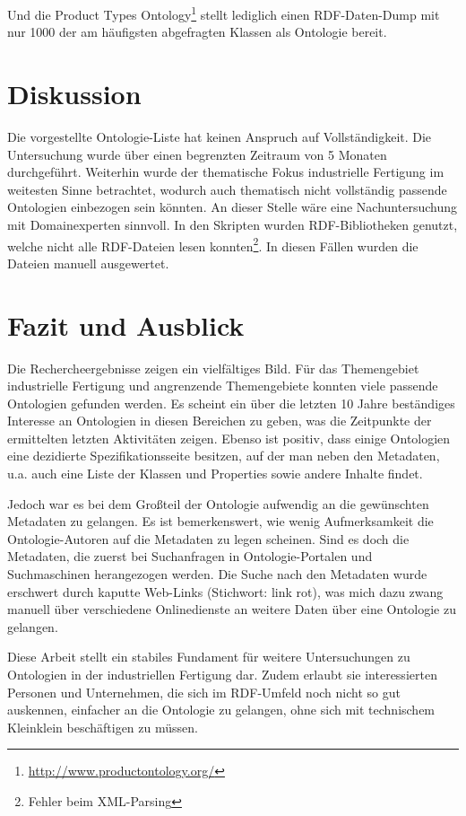\documentclass{article}
\begin{document}
Und die Product Types Ontology\footnote{\url{http://www.productontology.org/}} stellt lediglich einen RDF-Daten-Dump mit nur 1000 der am häufigsten abgefragten Klassen als Ontologie bereit.

\section{Diskussion}

Die vorgestellte Ontologie-Liste hat keinen Anspruch auf Vollständigkeit.
Die Untersuchung wurde über einen begrenzten Zeitraum von 5 Monaten durchgeführt.
Weiterhin wurde der thematische Fokus industrielle Fertigung im weitesten Sinne betrachtet, wodurch auch thematisch nicht vollständig passende Ontologien einbezogen sein könnten.
An dieser Stelle wäre eine Nachuntersuchung mit Domainexperten sinnvoll.
In den Skripten wurden RDF-Bibliotheken genutzt, welche nicht alle RDF-Dateien lesen konnten\footnote{Fehler beim XML-Parsing}.
In diesen Fällen wurden die Dateien manuell ausgewertet.

\section{Fazit und Ausblick}

Die Rechercheergebnisse zeigen ein vielfältiges Bild.
Für das Themengebiet industrielle Fertigung und angrenzende Themengebiete konnten viele passende Ontologien gefunden werden.
Es scheint ein über die letzten 10 Jahre beständiges Interesse an Ontologien in diesen Bereichen zu geben, was die Zeitpunkte der ermittelten letzten Aktivitäten zeigen.
Ebenso ist positiv, dass einige Ontologien eine dezidierte Spezifikationsseite besitzen, auf der man neben den Metadaten, u.a. auch eine Liste der Klassen und Properties sowie andere Inhalte findet.

Jedoch war es bei dem Großteil der Ontologie aufwendig an die gewünschten Metadaten zu gelangen.
Es ist bemerkenswert, wie wenig Aufmerksamkeit die Ontologie-Autoren auf die Metadaten zu legen scheinen.
Sind es doch die Metadaten, die zuerst bei Suchanfragen in Ontologie-Portalen und Suchmaschinen herangezogen werden.
Die Suche nach den Metadaten wurde erschwert durch kaputte Web-Links (Stichwort: link rot), was mich dazu zwang manuell über verschiedene Onlinedienste an weitere Daten über eine Ontologie zu gelangen.

Diese Arbeit stellt ein stabiles Fundament für weitere Untersuchungen zu Ontologien in der industriellen Fertigung dar. Zudem erlaubt sie interessierten Personen und Unternehmen, die sich im RDF-Umfeld noch nicht so gut auskennen, einfacher an die Ontologie zu gelangen, ohne sich mit technischem Kleinklein beschäftigen zu müssen.
\end{document}
